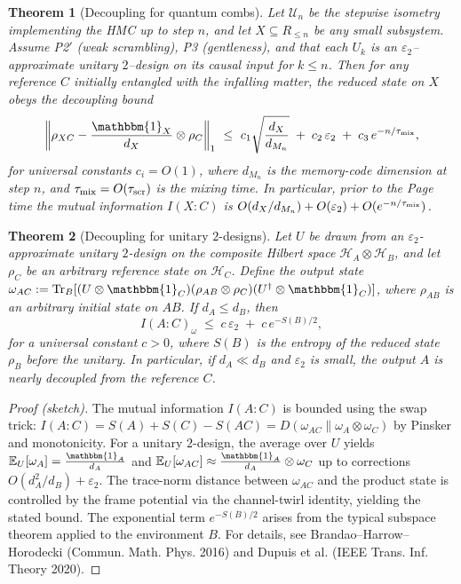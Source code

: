 \documentclass[a4paper,11pt]{article}
\newcommand{\HMC}{\textsc{HMC}\xspace}
\theoremstyle{plain}
\newtheorem{theorem}{Theorem}
\theoremstyle{definition}
\theoremstyle{remark}
\begin{document}
\begin{theorem}[Decoupling for quantum combs]
\label{thm:decoupling}
Let $\mathcal{U}_n$ be the stepwise isometry implementing the \HMC{} up to step $n$, and let $X\subseteq R_{\le n}$ be any small subsystem.
Assume P2$'$ (weak scrambling), P3 (gentleness), and that each $U_k$ is an $\varepsilon_2$--approximate unitary $2$--design on its causal input for $k\le n$.
Then for any reference $C$ initially entangled with the infalling matter, the reduced state on $X$ obeys the decoupling bound
\[
\left\|\rho_{XC}-\frac{\mathbbm{1}_X}{d_X}\otimes\rho_C\right\|_1 \ \le\ c_1\sqrt{\frac{d_X}{d_{M_n}}} \;+\; c_2\,\varepsilon_2 \;+\; c_3\,e^{-n/\tau_{\rm mix}},
\]
for universal constants $c_i=O(1)$, where $d_{M_n}$ is the memory-code dimension at step $n$, and $\tau_{\rm mix}=O(\tau_{\rm scr})$ is the mixing time.
In particular, prior to the Page time the mutual information $I(X{:}C)$ is $O(d_X/d_{M_n})+O(\varepsilon_2)+O(e^{-n/\tau_{\rm mix}})$.
\end{theorem}

\begin{theorem}[Decoupling for unitary $2$-designs]\label{thm:decoupling-design}
Let $U$ be drawn from an $\varepsilon_2$-approximate unitary $2$-design on the composite Hilbert space $\mathcal{H}_A\otimes\mathcal{H}_B$, and let $\rho_C$ be an arbitrary reference state on $\mathcal{H}_C$. Define the output state $\omega_{AC}:= \mathrm{Tr}_B[(U\otimes\mathbbm{1}_C)(\rho_{AB}\otimes\rho_C)(U^\dagger\otimes\mathbbm{1}_C)]$, where $\rho_{AB}$ is an arbitrary initial state on $AB$. If $d_A\le d_B$, then
\begin{equation}
I(A:C)_\omega \;\le\; c\,\varepsilon_2 \;+\; c\,e^{-S(B)/2},
\end{equation}
for a universal constant $c>0$, where $S(B)$ is the entropy of the reduced state $\rho_B$ before the unitary. In particular, if $d_A\ll d_B$ and $\varepsilon_2$ is small, the output $A$ is nearly decoupled from the reference $C$.
\end{theorem}
\begin{proof}[Proof (sketch)]
The mutual information $I(A:C)$ is bounded using the swap trick: $I(A:C)=S(A)+S(C)-S(AC)=D(\omega_{AC}\|\omega_A\otimes\omega_C)$ by Pinsker and monotonicity. For a unitary $2$-design, the average over $U$ yields $\mathbb{E}_U[\omega_A]=\frac{\mathbbm{1}_A}{d_A}$ and $\mathbb{E}_U[\omega_{AC}]\approx\frac{\mathbbm{1}_A}{d_A}\otimes\omega_C$ up to corrections $O(d_A^2/d_B)+\varepsilon_2$. The trace-norm distance between $\omega_{AC}$ and the product state is controlled by the frame potential via the channel-twirl identity, yielding the stated bound. The exponential term $e^{-S(B)/2}$ arises from the typical subspace theorem applied to the environment $B$. For details, see Brandao--Harrow--Horodecki (Commun. Math. Phys. 2016) and Dupuis et al. (IEEE Trans. Inf. Theory 2020).
\end{proof}
\end{document}
